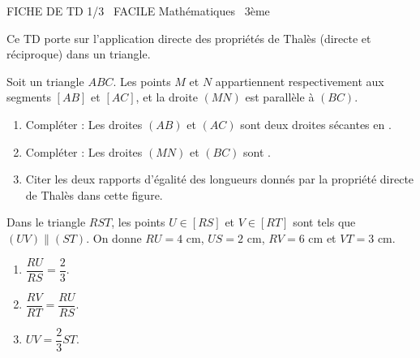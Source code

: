 \documentclass[11pt]{article}
\begin{document}
\begin{tcolorbox}[enhanced,colback=popink,colframe=popink,arc=10pt,boxrule=0pt,left=12pt,right=12pt,top=9pt,bottom=9pt]
{\color{white}\popxbold\small FICHE DE TD 1/3 \textbullet\ FACILE \hfill Mathématiques \textbullet\ 3ème\par}
\end{tcolorbox}
\vspace{4pt}
Ce TD porte sur l'application directe des propriétés de Thalès (directe et réciproque) dans un triangle.

\begin{exercice}
Soit un triangle $ABC$. Les points $M$ et $N$ appartiennent respectivement aux segments $[AB]$ et $[AC]$, et la droite $(MN)$ est parallèle à $(BC)$.
\begin{enumerate}
    \item Compléter : Les droites $(AB)$ et $(AC)$ sont deux droites \underline{\hspace{3cm}} sécantes en \underline{\hspace{1cm}}.
    \item Compléter : Les droites $(MN)$ et $(BC)$ sont \underline{\hspace{3cm}}.
    \item Citer les deux rapports d'égalité des longueurs donnés par la propriété directe de Thalès dans cette figure.
\end{enumerate}
\end{exercice}

\begin{exercice}
Dans le triangle $RST$, les points $U \in [RS]$ et $V \in [RT]$ sont tels que $(UV) \parallel (ST)$.
On donne $RU = 4$ cm, $US = 2$ cm, $RV = 6$ cm et $VT = 3$ cm.
\begin{enumerate}
    \item $\dfrac{RU}{RS} = \dfrac{2}{3}$.
    \item $\dfrac{RV}{RT} = \dfrac{RU}{RS}$.
    \item $UV = \dfrac{2}{3} ST$.
\end{enumerate}
\end{exercice}
\end{document}
